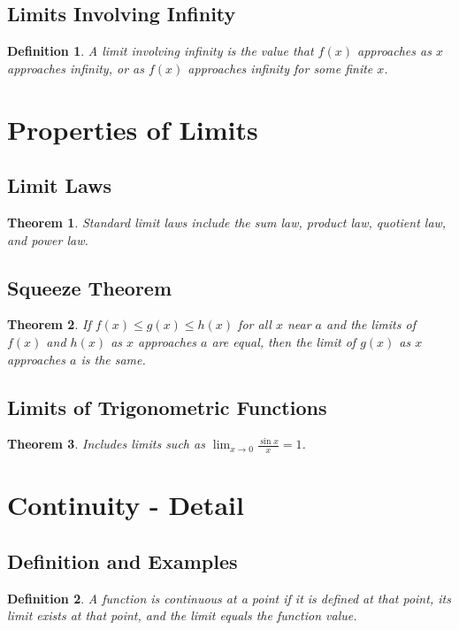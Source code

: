 \documentclass[a4paper,12pt]{book}
\newtheorem{theorem}{Theorem}
\newtheorem{definition}{Definition}
\begin{document}
\subsection{Limits Involving Infinity}
\begin{definition}
A limit involving infinity is the value that \( f(x) \) approaches as \( x \) approaches infinity, or as \( f(x) \) approaches infinity for some finite \( x \).
\end{definition}

\section{Properties of Limits}
\subsection{Limit Laws}
\begin{theorem}
Standard limit laws include the sum law, product law, quotient law, and power law.
\end{theorem}

\subsection{Squeeze Theorem}
\begin{theorem}
If \( f(x) \leq g(x) \leq h(x) \) for all \( x \) near \( a \) and the limits of \( f(x) \) and \( h(x) \) as \( x \) approaches \( a \) are equal, then the limit of \( g(x) \) as \( x \) approaches \( a \) is the same.
\end{theorem}

\subsection{Limits of Trigonometric Functions}
\begin{theorem}
Includes limits such as \( \lim_{x \to 0} \frac{\sin x}{x} = 1 \).
\end{theorem}

\section{Continuity - Detail}
\subsection{Definition and Examples}
\begin{definition}
A function is continuous at a point if it is defined at that point, its limit exists at that point, and the limit equals the function value.
\end{definition}
\end{document}
